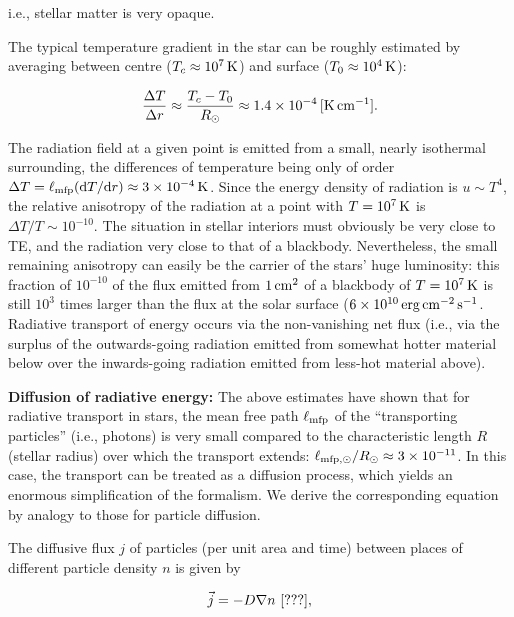 \documentclass[a4paper,10pt]{article}
\begin{document}
{\noindent}i.e., stellar matter is very opaque.

{\noindent}The typical temperature gradient in the star can be roughly estimated by averaging between centre ($T_c\approx10^7\,{\rm K}$) and surface ($T_0\approx10^4\,{\rm K}$):

\begin{align*}
    \frac{\Delta T}{\Delta r} \approx \frac{T_c-T_0}{R_\odot} \approx 1.4\times10^{-4}\,[{\rm K\,cm^{-1}}].
\end{align*}

{\noindent}The radiation field at a given point is emitted from a small, nearly isothermal surrounding, the differences of temperature being only of order $\Delta T=\ell_{\rm mfp}({\rm d}T/{\rm d}r)\approx3\times10^{-4}\,{\rm K}$. Since the energy density of radiation is $u\sim T^4$, the relative anisotropy of the radiation at a point with $T=10^7\,{\rm K}$ is $\Delta T/T\sim10^{-10}$. The situation in stellar interiors must obviously be very close to TE, and the radiation very close to that of a blackbody. Nevertheless, the small remaining anisotropy can easily be the carrier of the stars' huge luminosity: this fraction of $10^{-10}$ of the flux emitted from ${\rm 1\,cm^2}$ of a blackbody of $T=10^7\,{\rm K}$ is still $10^3$ times larger than the flux at the solar surface ($6\times10^{10}\,{\rm erg\,cm^{-2}\,s^{-1}}$. Radiative transport of energy occurs via the non-vanishing net flux (i.e., via the surplus of the outwards-going radiation emitted from somewhat hotter material below over the inwards-going radiation emitted from less-hot material above).

{\noindent}\textbf{Diffusion of radiative energy:} The above estimates have shown that for radiative transport in stars, the mean free path $\ell_{\rm mfp}$ of the ``transporting particles'' (i.e., photons) is very small compared to the characteristic length $R$ (stellar radius) over which the transport extends: $\ell_{\rm mfp,\odot}/R_\odot\approx3\times10^{-11}$. In this case, the transport can be treated as a diffusion process, which yields an enormous simplification of the formalism. We derive the corresponding equation by analogy to those for particle diffusion.

{\noindent}The diffusive flux $j$ of particles (per unit area and time) between places of different particle density $n$ is given by

\begin{align*}
    \vec{j} = -D\nabla n ~ [{\rm ???}],
\end{align*}
\end{document}
